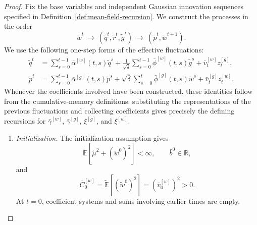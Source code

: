         \begin{proof}
        Fix the base variables and independent Gaussian innovation
        sequences specified in
        Definition~\ref{def:mean-field-recursion}.
        We construct the processes in the order
        \[
            \tilde w^t
            \ \longrightarrow\
            (\tilde q^t,\tilde r^t,\tilde g^t)
            \ \longrightarrow\
            (\tilde p^t,\tilde w^{t+1}).
        \]
        We use the following one-step forms of the effective fluctuations:
        \begin{align}
            \tilde q^t
            &=
            \sum_{s=0}^{t-1}
                \bar\alpha^{[w]}(t,s)\tilde q^s
            +
            \frac1{\sqrt{\bar\delta}}
            \sum_{s=0}^{t-1}
                \bar\phi^{[w]}(t,s)\tilde g^s
            +
            \bar v_t^{[w]}z_t^{[g]},
            \label{eq:mf-proof-forward-one-step}\\
            \tilde p^t
            &=
            \sum_{s=0}^{t-1}
                \bar\alpha^{[g]}(t,s)\tilde p^s
            +
            \sqrt{\bar\delta}
            \sum_{s=0}^{t}
                \bar\phi^{[g]}(t,s)\tilde w^s
            +
            \bar v_t^{[g]}z_t^{[w]}.
            \label{eq:mf-proof-backward-one-step}
        \end{align}
        Whenever the coefficients involved have been constructed,
        these identities follow from the cumulative-memory definitions:
        substituting the representations of the previous fluctuations
        and collecting coefficients gives precisely the defining
        recursions for $\bar\gamma^{[w]}$, $\bar\gamma^{[g]}$,
        $\xi^{[g]}$, and $\xi^{[w]}$.
        
        \begin{enumerate}[wide]
            \item \emph{Initialization.}
            The initialization assumption gives
            \[
                \tilde{\mathbb E}
                [\tilde\mu^2+(\tilde w^0)^2]<\infty,
                \qquad
                \bar b^0\in\mathbb R,
            \]
            and
            \[
                \bar C_0^{[w]}
                =
                \tilde{\mathbb E}[(\tilde w^0)^2]
                =
                (\bar v_0^{[w]})^2
                >0.
            \]
            At $t=0$, coefficient systems and sums involving
            earlier times are empty.
        

\end{enumerate}
\end{proof}
